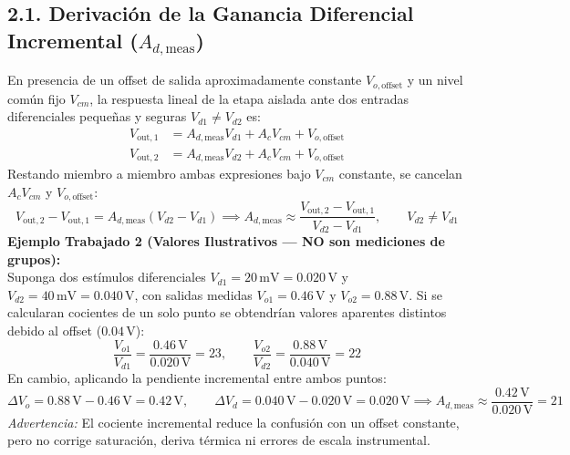 \documentclass[10pt, a4paper]{article}
\begin{document}
\subsection*{2.1. Derivación de la Ganancia Diferencial Incremental ($A_{d,\mathrm{meas}}$)}
En presencia de un offset de salida aproximadamente constante $V_{o,\mathrm{offset}}$ y un nivel común fijo $V_{cm}$, la respuesta lineal de la etapa aislada ante dos entradas diferenciales pequeñas y seguras $V_{d1} \neq V_{d2}$ es:
\begin{align}
    V_{\mathrm{out},1} &= A_{d,\mathrm{meas}} V_{d1} + A_c V_{cm} + V_{o,\mathrm{offset}} \\
    V_{\mathrm{out},2} &= A_{d,\mathrm{meas}} V_{d2} + A_c V_{cm} + V_{o,\mathrm{offset}}
\end{align}
Restando miembro a miembro ambas expresiones bajo $V_{cm}$ constante, se cancelan $A_c V_{cm}$ y $V_{o,\mathrm{offset}}$:
\begin{equation}
    V_{\mathrm{out},2} - V_{\mathrm{out},1} = A_{d,\mathrm{meas}}(V_{d2} - V_{d1}) \implies \boxed{A_{d,\mathrm{meas}} \approx \frac{V_{\mathrm{out},2} - V_{\mathrm{out},1}}{V_{d2} - V_{d1}}, \qquad V_{d2} \neq V_{d1}}
\end{equation}
\textbf{Ejemplo Trabajado 2 (Valores Ilustrativos — NO son mediciones de grupos):} \\
Suponga dos estímulos diferenciales $V_{d1} = 20\,\text{mV} = 0.020\,\text{V}$ y $V_{d2} = 40\,\text{mV} = 0.040\,\text{V}$, con salidas medidas $V_{o1} = 0.46\,\text{V}$ y $V_{o2} = 0.88\,\text{V}$. Si se calcularan cocientes de un solo punto se obtendrían valores aparentes distintos debido al offset ($0.04\,\text{V}$):
\begin{equation*}
    \frac{V_{o1}}{V_{d1}} = \frac{0.46\,\text{V}}{0.020\,\text{V}} = 23, \qquad \frac{V_{o2}}{V_{d2}} = \frac{0.88\,\text{V}}{0.040\,\text{V}} = 22
\end{equation*}
En cambio, aplicando la pendiente incremental entre ambos puntos:
\begin{equation*}
    \Delta V_o = 0.88\,\text{V} - 0.46\,\text{V} = 0.42\,\text{V}, \qquad \Delta V_d = 0.040\,\text{V} - 0.020\,\text{V} = 0.020\,\text{V} \implies \boxed{A_{d,\mathrm{meas}} \approx \frac{0.42\,\text{V}}{0.020\,\text{V}} = 21}
\end{equation*}
\textit{Advertencia:} El cociente incremental reduce la confusión con un offset constante, pero no corrige saturación, deriva térmica ni errores de escala instrumental.
\end{document}
